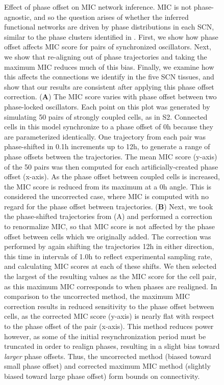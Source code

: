 \begin{figure}[p]
    \caption{\label{fig:s4}
Effect of phase offset on MIC network inference.
    MIC is not phase-agnostic, and so the question arises of whether the inferred functional networks are driven by phase distributions in each SCN, similar to the phase clusters identified in \cite{Evans2013}.
First, we show how phase offset affects MIC score for pairs of synchronized oscillators.
Next, we show that re-aligning out of phase trajectories and taking the maximum MIC reduces much of this bias.
Finally, we examine how this affects the connections we identify in the five SCN tissues, and show that our results are consistent after applying this phase offset correction.
    (\textbf{A})
    The MIC score varies with phase offset between two phase-locked oscillators.
    Each point on this plot was generated by simulating 50 pairs of strongly coupled cells, as in S2.
    Connected cells in this model synchronize to a phase offset of 0h because they are parameterized identically.
    One trajectory from each pair was phase-shifted in 0.1h increments up to 12h, to generate a range of phase offsets between the trajectories.
    The mean MIC score (y-axis) of the 50 pairs was then computed for each artificially-created phase offset (x-axis).
    As the phase offset between coupled cells is increased, the MIC score is reduced from its maximum at a 0h angle.
    This is considered the uncorrected case, where MIC is computed with no regard for the phase offset between trajectories.
    (\textbf{B})
    Next, we took the phase-shifted trajectories from (A) and performed a correction to renormalize MIC, so that MIC score is not affected by the phase offset between cells which we originally added.
    The correction was performed by again shifting the trajectories 12h in either direction, this time in intervals of 1.0h to reflect experimental sampling rate, and calculating MIC scores at each of these shifts.
    We then selected the largest of the resulting values as the MIC score for the cell pair, as this maximum MIC corresponds to when phases are realigned.
    In comparison to the uncorrected method, the maximum MIC correction results in reduced sensitivity to the phase offset between cells, as the corrected MIC score (y-axis) is nearly flat with respect to the phase offset of the pair (x-axis).
    This method reduces power however, as some of the initial resynchronization period must be truncated in order to realign phases, resulting in a slight bias toward \textit{larger} phase offsets.
    Thus, the uncorrected method (biased toward small phase offset) and corrected maximum MIC method (slightly biased toward large phase offset) form bounds on connectivity.
}
\end{figure}
